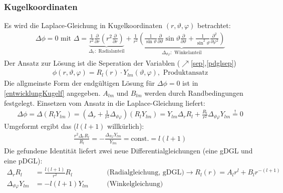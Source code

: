    \subsubsection{Kugelkoordinaten}
   		  Es wird die Laplace-Gleichung in Kugelkoordinaten $(r, \vartheta,\varphi)$ betrachtet:
   \begin{equation}\begin{split}
   		\Delta \phi = 0 \text{ mit } \Delta = \underbrace{\frac{1}{r^2}\frac{\partial}{\partial r} \left( r^2 \frac{\partial}{\partial r} \right)}_{\Delta _r: \text{ Radialanteil}} + \frac{1}{r^2} \underbrace{\left( \frac{1}{\sin\vartheta} \frac{\partial}{\partial\vartheta} \sin\vartheta \frac{\partial}{\partial\vartheta} + \frac{1}{\sin^2\vartheta} \frac{\partial^2}{\partial\varphi^2}  \right)}_{\Delta _{\vartheta\varphi}: \text{ Winkelanteil}}
   \end{split}\end{equation}
   Der Ansatz zur Lösung ist die Seperation der Variablen ($\nearrow$\ref{sep},\ref{pdglsep})
   \begin{equation}\label{produktans}\begin{split}
   		\phi(r,\vartheta,\varphi) = R_l(r) \cdot Y_{lm} (\vartheta,\varphi), \text{ Produktansatz}
   \end{split}\end{equation}
   Die allgmeinste Form der endgültigen Lösung für $\Delta \phi = 0$ ist in \ref{entwicklungKugelf} angegeben. $A_{lm}$ und $B_{lm}$ werden durch Randbedingungen festgelegt. Einsetzen vom Ansatz in die Laplace-Gleichung liefert:
   \begin{equation}\begin{split}
   		\Delta \phi = \Delta \left( R_l Y_{lm}\right) = \left(\Delta _r + \frac{1}{r^2}\Delta _{\vartheta\varphi}\right) \left( R_l Y_{lm}\right) = \boxed{Y_{lm} \Delta _r R_l + \frac{R_l}{r^2}\Delta _{\vartheta\varphi} Y_{lm} \stackrel{!}{=} 0}
   \end{split}\end{equation}
   Umgeformt ergibt das ($ l(l+1)$ willkürlich):
   \begin{equation}\begin{split}
   		\boxed{\frac{r^2\Delta _rR_l}{R_l} = - \frac{\Delta _{\vartheta\varphi} Y_{lm}}{Y_{lm}} = \text{const.} = l(l+1)}
   \end{split}\end{equation}
   Die gefundene Identität liefert zwei neue Differentialgleichungen (eine gDGL und eine pDGL):
   \begin{align}
   	\Delta _r R_l                     & = \frac{l(l+1)}{r^2} R_l & \quad & \text{(Radialgleichung, gDGL)} \to \boxed{R_l(r) = A_l r^l+ B_l r^{-(l+1)}} \\
   	\Delta _{\vartheta\varphi} Y_{lm} & = - l(l+1) Y_{lm}        & \quad & \text{(Winkelgleichung)}
   \end{align}
